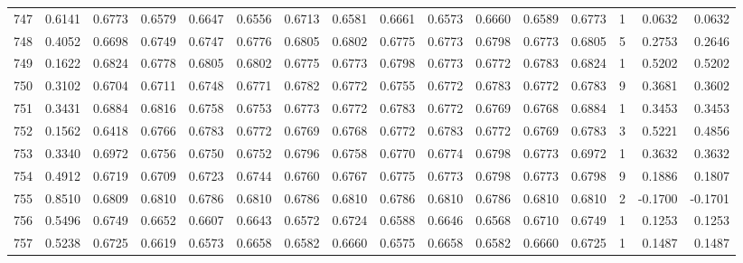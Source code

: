 \begin{tabular}{lrrrrrrrrrrrrrrr}
747 &      0.6141 &  0.6773 &  0.6579 &  0.6647 &  0.6556 &  0.6713 &  0.6581 &  0.6661 &  0.6573 &  0.6660 &   0.6589 &     0.6773 &      1 &                    0.0632 &                     0.0632 \\
748 &      0.4052 &  0.6698 &  0.6749 &  0.6747 &  0.6776 &  0.6805 &  0.6802 &  0.6775 &  0.6773 &  0.6798 &   0.6773 &     0.6805 &      5 &                    0.2753 &                     0.2646 \\
749 &      0.1622 &  0.6824 &  0.6778 &  0.6805 &  0.6802 &  0.6775 &  0.6773 &  0.6798 &  0.6773 &  0.6772 &   0.6783 &     0.6824 &      1 &                    0.5202 &                     0.5202 \\
750 &      0.3102 &  0.6704 &  0.6711 &  0.6748 &  0.6771 &  0.6782 &  0.6772 &  0.6755 &  0.6772 &  0.6783 &   0.6772 &     0.6783 &      9 &                    0.3681 &                     0.3602 \\
751 &      0.3431 &  0.6884 &  0.6816 &  0.6758 &  0.6753 &  0.6773 &  0.6772 &  0.6783 &  0.6772 &  0.6769 &   0.6768 &     0.6884 &      1 &                    0.3453 &                     0.3453 \\
752 &      0.1562 &  0.6418 &  0.6766 &  0.6783 &  0.6772 &  0.6769 &  0.6768 &  0.6772 &  0.6783 &  0.6772 &   0.6769 &     0.6783 &      3 &                    0.5221 &                     0.4856 \\
753 &      0.3340 &  0.6972 &  0.6756 &  0.6750 &  0.6752 &  0.6796 &  0.6758 &  0.6770 &  0.6774 &  0.6798 &   0.6773 &     0.6972 &      1 &                    0.3632 &                     0.3632 \\
754 &      0.4912 &  0.6719 &  0.6709 &  0.6723 &  0.6744 &  0.6760 &  0.6767 &  0.6775 &  0.6773 &  0.6798 &   0.6773 &     0.6798 &      9 &                    0.1886 &                     0.1807 \\
755 &      0.8510 &  0.6809 &  0.6810 &  0.6786 &  0.6810 &  0.6786 &  0.6810 &  0.6786 &  0.6810 &  0.6786 &   0.6810 &     0.6810 &      2 &                   -0.1700 &                    -0.1701 \\
756 &      0.5496 &  0.6749 &  0.6652 &  0.6607 &  0.6643 &  0.6572 &  0.6724 &  0.6588 &  0.6646 &  0.6568 &   0.6710 &     0.6749 &      1 &                    0.1253 &                     0.1253 \\
757 &      0.5238 &  0.6725 &  0.6619 &  0.6573 &  0.6658 &  0.6582 &  0.6660 &  0.6575 &  0.6658 &  0.6582 &   0.6660 &     0.6725 &      1 &                    0.1487 &                     0.1487 \\

\end{tabular}
